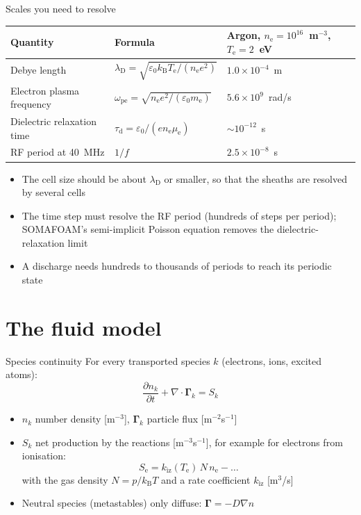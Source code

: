 \documentclass[aspectratio=169,11pt]{beamer}
\newcommand{\Te}{T_\mathrm{e}}
\newcommand{\nel}{n_\mathrm{e}}
\begin{document}
\begin{frame}{Scales you need to resolve}
  \begin{tabular}{lll}
    \toprule
    Quantity & Formula & Argon, $\nel=10^{16}$~m$^{-3}$, $\Te=2$~eV \\
    \midrule
    Debye length & $\lambda_\mathrm{D}=\sqrt{\varepsilon_0 k_\mathrm{B}\Te/(\nel e^2)}$ & $1.0\times10^{-4}$~m \\
    Electron plasma frequency & $\omega_\mathrm{pe}=\sqrt{\nel e^2/(\varepsilon_0 m_\mathrm{e})}$ & $5.6\times10^{9}$~rad/s \\
    Dielectric relaxation time & $\tau_\mathrm{d}=\varepsilon_0/(e\nel\mu_\mathrm{e})$ & $\sim10^{-12}$~s \\
    RF period at 40~MHz & $1/f$ & $2.5\times10^{-8}$~s \\
    \bottomrule
  \end{tabular}
  \vspace{1em}
  \begin{itemize}
    \item The cell size should be about $\lambda_\mathrm{D}$ or smaller, so that the
          sheaths are resolved by several cells
    \item The time step must resolve the RF period (hundreds of steps per period);
          SOMAFOAM's semi-implicit Poisson equation removes the dielectric-relaxation limit
    \item A discharge needs hundreds to thousands of periods to reach its periodic state
  \end{itemize}
\end{frame}

\section{The fluid model}

\begin{frame}{Species continuity}
  For every transported species $k$ (electrons, ions, excited atoms):
  \begin{equation*}
    \frac{\partial n_k}{\partial t} + \nabla\cdot\boldsymbol{\Gamma}_k = S_k
  \end{equation*}
  \begin{itemize}
    \item $n_k$ number density [m$^{-3}$], $\boldsymbol{\Gamma}_k$ particle flux [m$^{-2}$s$^{-1}$]
    \item $S_k$ net production by the reactions [m$^{-3}$s$^{-1}$], for example for
          electrons from ionisation:
          \begin{equation*}
            S_\mathrm{e} = k_\mathrm{iz}(\Te)\,N\,\nel - \dots
          \end{equation*}
          with the gas density $N=p/k_\mathrm{B}T$ and a rate coefficient $k_\mathrm{iz}$ [m$^3$/s]
    \item Neutral species (metastables) only diffuse: $\boldsymbol{\Gamma}=-D\nabla n$
  \end{itemize}
\end{frame}
\end{document}
